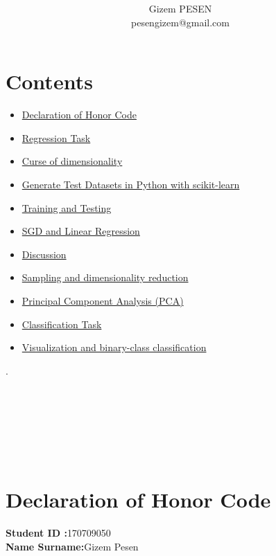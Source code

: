 \documentclass[onecolumn]{article}
\title{\spacecaps{CENG 3521 Data Mining Assigment 1 }\\ \normalsize \spacesc{} }
\author{Gizem PESEN\\pesengizem@gmail.com}
\begin{document}
\maketitle



\section{Contents }

\begin{itemize}
\item \hyperref[sec:1]{Declaration of Honor Code}
\item \hyperref[sec:2]{Regression Task}
\item \hyperref[sec:2]{Curse of dimensionality}
\item \hyperref[sec:2.0.1]{Generate Test Datasets in Python with scikit-learn}
\item \hyperref[sec:2.0.2]{Training and Testing}
\item \hyperref[sec:2.0.3]{ SGD and Linear Regression }   
\item \hyperref[sec:2.0.4]{Discussion }  
\item  \hyperref[sec:2.0.5]{Sampling and dimensionality reduction}
\item \hyperref[sec:2.0.6]{Principal Component Analysis (PCA)}
\item \hyperref[sec:3]{ Classification Task}
\item \hyperref[sec:3.0.1]{Visualization and binary-class classification}
\end{itemize}

.\\\\\\\\\\\\\\
\section{Declaration of Honor Code}
\label{sec:1}
\textbf{Student ID :}170709050\\
\textbf{Name Surname:}Gizem Pesen\\
\end{document}
